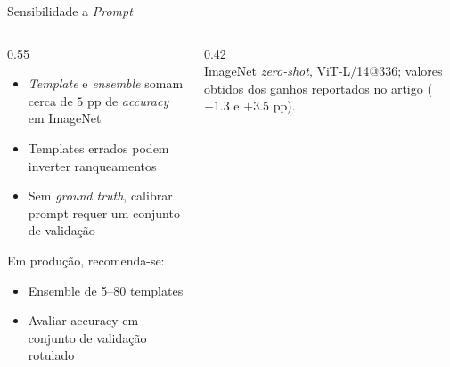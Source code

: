 \documentclass[aspectratio=169,xcolor=dvipsnames]{beamer}
\begin{document}
  \begin{frame}{Sensibilidade a \textit{Prompt}}
    \begin{columns}[T]
      \begin{column}{0.55\textwidth}
        \begin{itemize}
          \item \textit{Template} e \textit{ensemble} somam cerca de $5$ pp de \textit{accuracy} em ImageNet
          \item Templates errados podem inverter ranqueamentos
          \item Sem \textit{ground truth}, calibrar prompt requer um conjunto de validação
        \end{itemize}

        \vspace{0.3em}
        Em produção, recomenda-se:
        \begin{itemize}
          \item Ensemble de 5--80 templates
          \item Avaliar accuracy em conjunto de validação rotulado
        \end{itemize}
      \end{column}
      \begin{column}{0.42\textwidth}
        \centering
        \\[0.2em]
        {\scriptsize ImageNet \textit{zero-shot}, ViT-L/14@336; valores obtidos dos ganhos reportados no artigo ($+1.3$ e $+3.5$ pp).}
      \end{column}
    \end{columns}
  \end{frame}
\end{document}
